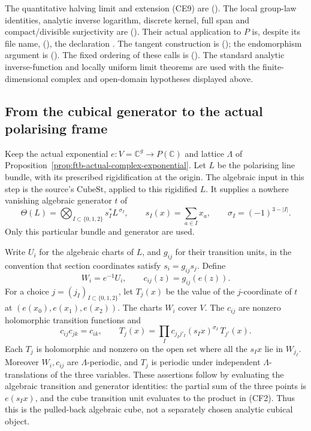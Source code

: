 The quantitative halving limit and extension (CE9) are
().
The local group-law identities, analytic inverse logarithm, discrete
kernel, full span and compact/divisible surjectivity are
().
Their actual application to \(P\) is, despite its file name,
(),
the declaration .
The tangent construction is
();
the endomorphism argument is
().
The fixed ordering of these calls is
().
The standard analytic inverse-function and locally uniform limit
theorems are used with the finite-dimensional complex and open-domain
hypotheses displayed above.

\subsection{From the cubical generator to the actual polarising frame}
\label{subsec:ftb-cubical-complex-frame}

Keep the actual exponential \(e:V=\mathbb C^g\to P(\mathbb C)\) and
lattice \(\Lambda\) of
Proposition~\ref{prop:ftb-actual-complex-exponential}.
Let \(L\) be the polarising line bundle, with its prescribed
rigidification at the origin.  The algebraic input in this step is the
source's \(\mathrm{CubeSt}\), applied to this rigidified \(L\).
It supplies a nowhere vanishing algebraic generator \(t\) of
\[
 \Theta(L)=\bigotimes_{I\subset\{0,1,2\}}
              s_I^*L^{\,\sigma_I},\qquad
 s_I(x)=\sum_{a\in I}x_a,\qquad \sigma_I=(-1)^{3-|I|}.        \tag{CF1}
\]
Only this particular bundle and generator are used.

Write \(U_i\) for the algebraic charts of \(L\), and \(g_{ij}\) for their
transition units, in the convention that section coordinates satisfy
\(s_i=g_{ij}s_j\).  Define
\[
 W_i=e^{-1}U_i,\qquad c_{ij}(z)=g_{ij}(e(z)).
\]
For a choice \(j=(j_I)_{I\subset\{0,1,2\}}\), let \(T_j(x)\) be the value
of the \(j\)-coordinate of \(t\) at
\((e(x_0),e(x_1),e(x_2))\).  The charts \(W_i\) cover \(V\).
The \(c_{ij}\) are nonzero holomorphic transition functions and
\[
 c_{ij}c_{jk}=c_{ik},\qquad
 T_j(x)=\prod_I c_{j_Ij'_I}(s_Ix)^{\sigma_I}\,T_{j'}(x).    \tag{CF2}
\]
Each \(T_j\) is holomorphic and nonzero on the open set where all the
\(s_Ix\) lie in \(W_{j_I}\).  Moreover \(W_i,c_{ij}\) are
\(\Lambda\)-periodic, and \(T_j\) is periodic under independent
\(\Lambda\)-translations of the three variables.
These assertions follow by evaluating the algebraic transition and
generator identities: the partial sum of the three points is
\(e(s_Ix)\), and the cube transition unit evaluates to the product in
(CF2).  Thus this is the pulled-back algebraic cube, not a separately
chosen analytic cubical object.

